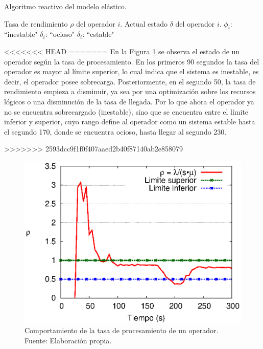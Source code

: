 \begin{algorithm}[!ht]
	\caption{Algoritmo reactivo del modelo el\'astico.}
	\label{alg:reactive}
	\begin{algorithmic}[1]
	\REQUIRE Tasa de rendimiento $\rho$ del operador $i$.
	\ENSURE Actual estado $\delta$ del operador $i$.
		\RETURN $\phi_i$: ``inestable"
		\RETURN $\delta_i$: ``ocioso"
	\ELSE
		\RETURN $\delta_i$: ``estable"
	\ENDIF
	\end{algorithmic}
\end{algorithm}

<<<<<<< HEAD
=======
En la Figura \ref{fig:umbrales} se observa el estado de un operador seg\'un la tasa de procesamiento. En los primeros 90 segundos la tasa del operador es mayor al l\'imite superior, lo cual indica que el sistema es inestable, es decir, el operador posee sobrecarga. Posteriormente, en el segundo 50, la tasa de rendimiento empieza a disminuir, ya sea por una optimizaci\'on sobre los recursos l\'ogicos o una disminuci\'on de la tasa de llegada. \normalsize{Por lo que ahora el operador ya no se encuentra sobrecargado (inestable), sino que se encuentra entre el l\'imite inferior y superior, cuyo rango define al operador como un sistema estable hasta el segundo 170, donde se encuentra ocioso, hasta llegar al segundo 230.}

>>>>>>> 2593dcc9f1f0f407aaed2b40f87140ab2e858079
\begin{figure}[ht!]
  \centering
  \captionsetup{justification=centering}
    \includegraphics[scale=0.8]{images/Umbrales.eps}
	\caption[Comportamiento de la tasa de procesamiento de un operador.]{Comportamiento de la tasa de procesamiento de un operador. \\ Fuente: Elaboración propia.}
  \label{fig:umbrales}
\end{figure}


